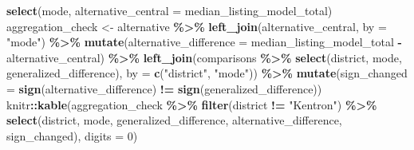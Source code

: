 \documentclass[
]{article}
\newenvironment{Shaded}{\begin{snugshade}}{\end{snugshade}}
\newcommand{\AttributeTok}[1]{\textcolor[rgb]{0.13,0.29,0.53}{#1}}
\newcommand{\DecValTok}[1]{\textcolor[rgb]{0.00,0.00,0.81}{#1}}
\newcommand{\FunctionTok}[1]{\textcolor[rgb]{0.13,0.29,0.53}{\textbf{#1}}}
\newcommand{\NormalTok}[1]{#1}
\newcommand{\OtherTok}[1]{\textcolor[rgb]{0.56,0.35,0.01}{#1}}
\newcommand{\SpecialCharTok}[1]{\textcolor[rgb]{0.81,0.36,0.00}{\textbf{#1}}}
\newcommand{\StringTok}[1]{\textcolor[rgb]{0.31,0.60,0.02}{#1}}
\begin{document}
\begin{Shaded}
\begin{Highlighting}[]
  \FunctionTok{select}\NormalTok{(mode, }\AttributeTok{alternative\_central =}\NormalTok{ median\_listing\_model\_total)}
\NormalTok{aggregation\_check }\OtherTok{\textless{}{-}}\NormalTok{ alternative }\SpecialCharTok{\%\textgreater{}\%} \FunctionTok{left\_join}\NormalTok{(alternative\_central, }\AttributeTok{by =} \StringTok{"mode"}\NormalTok{) }\SpecialCharTok{\%\textgreater{}\%}
  \FunctionTok{mutate}\NormalTok{(}\AttributeTok{alternative\_difference =}\NormalTok{ median\_listing\_model\_total }\SpecialCharTok{{-}}\NormalTok{ alternative\_central) }\SpecialCharTok{\%\textgreater{}\%}
  \FunctionTok{left\_join}\NormalTok{(comparisons }\SpecialCharTok{\%\textgreater{}\%} \FunctionTok{select}\NormalTok{(district, mode, generalized\_difference), }\AttributeTok{by =} \FunctionTok{c}\NormalTok{(}\StringTok{"district"}\NormalTok{, }\StringTok{"mode"}\NormalTok{)) }\SpecialCharTok{\%\textgreater{}\%}
  \FunctionTok{mutate}\NormalTok{(}\AttributeTok{sign\_changed =} \FunctionTok{sign}\NormalTok{(alternative\_difference) }\SpecialCharTok{!=} \FunctionTok{sign}\NormalTok{(generalized\_difference))}
\NormalTok{knitr}\SpecialCharTok{::}\FunctionTok{kable}\NormalTok{(aggregation\_check }\SpecialCharTok{\%\textgreater{}\%} \FunctionTok{filter}\NormalTok{(district }\SpecialCharTok{!=} \StringTok{"Kentron"}\NormalTok{) }\SpecialCharTok{\%\textgreater{}\%}
  \FunctionTok{select}\NormalTok{(district, mode, generalized\_difference, alternative\_difference, sign\_changed), }\AttributeTok{digits =} \DecValTok{0}\NormalTok{)}
\end{Highlighting}
\end{Shaded}
\end{document}
